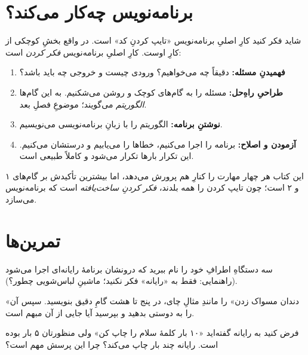 \section{برنامه‌نویس چه‌کار می‌کند؟}

شاید فکر کنید کارِ اصلیِ برنامه‌نویس «تایپ کردنِ کد» است. در واقع بخشِ
کوچکی از کارِ اوست. کارِ اصلیِ برنامه‌نویس \emph{فکر کردن} است:

\begin{enumerate}
  \item \textbf{فهمیدنِ مسئله:} دقیقاً چه می‌خواهیم؟ ورودی چیست و خروجی چه
        باید باشد؟
  \item \textbf{طراحیِ راهِ‌حل:} مسئله را به گام‌های کوچک و روشن می‌شکنیم.
        به این گام‌ها \emph{الگوریتم} می‌گویند؛ موضوعِ فصلِ بعد.
  \item \textbf{نوشتنِ برنامه:} الگوریتم را با زبانِ برنامه‌نویسی
        می‌نویسیم.
  \item \textbf{آزمودن و اصلاح:} برنامه را اجرا می‌کنیم، خطاها را می‌یابیم و
        درستشان می‌کنیم. این تکرار بارها تکرار می‌شود و کاملاً طبیعی است.
\end{enumerate}

این کتاب هر چهار مهارت را کنارِ هم پرورش می‌دهد، اما بیشترین تأکیدش بر
گام‌های ۱ و ۲ است؛ چون تایپ کردن را همه بلدند، \emph{فکر کردنِ ساخت‌یافته}
است که برنامه‌نویس می‌سازد.

\section{تمرین‌ها}

\exercise سه دستگاهِ اطرافِ خود را نام ببرید که درونشان برنامهٔ رایانه‌ای
اجرا می‌شود (راهنمایی: فقط به «رایانه» فکر نکنید؛ ماشینِ لباس‌شویی چطور؟).

\exercise «دندان مسواک زدن» را مانندِ مثالِ چای، در پنج تا هشت گامِ دقیق
بنویسید. سپس آن را به دوستی بدهید و بپرسید آیا جایی از آن مبهم است.

\exercise فرض کنید به رایانه گفته‌اید «۱۰ بار کلمهٔ سلام را چاپ کن» ولی
منظورتان ۵ بار بوده است. رایانه چند بار چاپ می‌کند؟ چرا این پرسش مهم است؟
